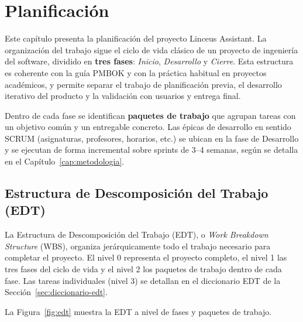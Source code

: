 
\chapter{Planificación}\label{cap:planificacion}

Este capítulo presenta la planificación del proyecto Linceus Assistant. La organización del trabajo sigue el ciclo de vida clásico de un proyecto de ingeniería del software, dividido en \textbf{tres fases}: \textit{Inicio}, \textit{Desarrollo} y \textit{Cierre}. Esta estructura es coherente con la guía PMBOK y con la práctica habitual en proyectos académicos, y permite separar el trabajo de planificación previa, el desarrollo iterativo del producto y la validación con usuarios y entrega final.

Dentro de cada fase se identifican \textbf{paquetes de trabajo} que agrupan tareas con un objetivo común y un entregable concreto. Las épicas de desarrollo en sentido SCRUM (asignaturas, profesores, horarios, etc.) se ubican en la fase de Desarrollo y se ejecutan de forma incremental sobre sprints de 3--4 semanas, según se detalla en el Capítulo~\ref{cap:metodologia}.


\section{Estructura de Descomposición del Trabajo (EDT)}\label{sec:edt}

La Estructura de Descomposición del Trabajo (EDT), o \textit{Work Breakdown Structure} (WBS), organiza jerárquicamente todo el trabajo necesario para completar el proyecto. El nivel 0 representa el proyecto completo, el nivel 1 las tres fases del ciclo de vida y el nivel 2 los paquetes de trabajo dentro de cada fase. Las tareas individuales (nivel 3) se detallan en el diccionario EDT de la Sección~\ref{sec:diccionario-edt}.

La Figura~\ref{fig:edt} muestra la EDT a nivel de fases y paquetes de trabajo.

